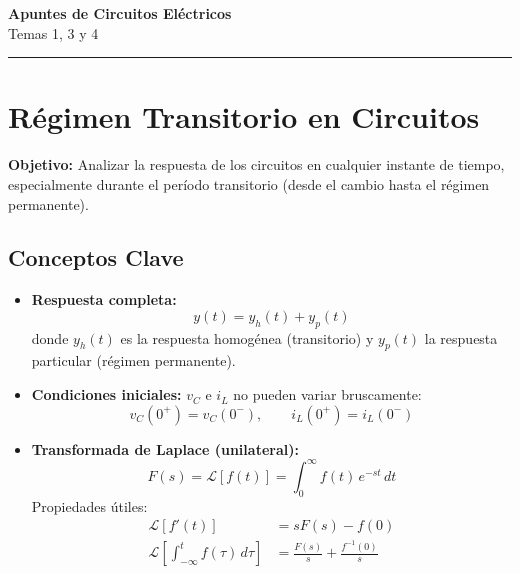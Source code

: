 \documentclass[12pt,a4paper]{article}
\begin{document}
\begin{center}
  {\huge\bfseries\color{mainblue} Apuntes de Circuitos Eléctricos}\\[0.4em]
  {\large\color{gray} Temas 1, 3 y 4}\\[0.3em]
  \color{rulegray}\rule{0.6\linewidth}{1pt}
\end{center}
\vspace{1em}

\section{Régimen Transitorio en Circuitos}

\textbf{Objetivo:} Analizar la respuesta de los circuitos en cualquier instante de tiempo,
especialmente durante el período transitorio (desde el cambio hasta el régimen permanente).

\subsection{Conceptos Clave}

\begin{itemize}[leftmargin=1.5em, itemsep=4pt]

  \item \textbf{Respuesta completa:}
  \[
    y(t) = y_h(t) + y_p(t)
  \]
  donde $y_h(t)$ es la respuesta homogénea (transitorio) y $y_p(t)$ la respuesta
  particular (régimen permanente).

  \item \textbf{Condiciones iniciales:} $v_C$ e $i_L$ no pueden variar bruscamente:
  \[
    v_C(0^+) = v_C(0^-), \qquad i_L(0^+) = i_L(0^-)
  \]

  \item \textbf{Transformada de Laplace (unilateral):}
  \[
    F(s) = \mathcal{L}[f(t)] = \int_0^\infty f(t)\,e^{-st}\,dt
  \]
  Propiedades útiles:
  \begin{align*}
    \mathcal{L}[f'(t)] &= sF(s) - f(0)\\
    \mathcal{L}\!\left[\int_{-\infty}^t f(\tau)\,d\tau\right] &= \frac{F(s)}{s}
      + \frac{f^{-1}(0)}{s}
  \end{align*}
\end{itemize}

\end{document}

